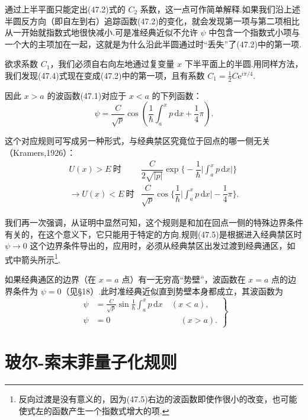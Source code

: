 通过上半平面只能定出(47.2)式的 $C_2$ 系数，这一点可作简单解释.如果我们沿上述半圆反方向（即自左到右）追踪函数(47.2)的变化，就会发现第一项与第二项相比从一开始就指数式地很快减小.可是准经典近似不允许 $\psi$ 中包含一个指数式小项与一个大的主项加在一起，这就是为什么沿此半圆通过时“丢失”了(47.2)中的第一项.

欲求系数 $C_1$，我们必须自右向左地通过复变量 $x$ 下半平面上的半圆.用同样方法，我们发现(47.4)式现在变成(47.2)中的第一项，且有系数 $C_1=\frac{1}{2}C\mathrm{e}^{i\pi/4}$.

因此 $x>a$ 的波函数(47.1)对应于 $x<a$ 的下列函数：
\begin{equation*}
  \psi=\frac{C}{\sqrt{p}}\cos\left(\frac{1}{\hbar}\int_a^x p\,\mathrm{d}x+\frac{1}{4}\pi\right).
\end{equation*}

这个对应规则可写成另一种形式，与经典禁区究竟位于回点的哪一侧无关（Kramers,1926）：
\begin{equation}
\begin{array}{ll}
  U(x)>E\ \text{时} &
  \dfrac{C}{2\sqrt{|p|}}\exp\Big\{-\dfrac{1}{\hbar}
  \Big|\int_a^x p\,\mathrm{d}x\Big|\Big\}\\[2ex]
  \longrightarrow U(x)<E\ \text{时} &
  \dfrac{C}{\sqrt{p}}\cos\Big\{\dfrac{1}{\hbar}
  \Big|\int_a^x p\,\mathrm{d}x\Big|-\dfrac{1}{4}\pi\Big\}.
\end{array}
\end{equation}

我们再一次强调，从证明中显然可知，这个规则是和加在回点一侧的特殊边界条件有关的，在这个意义下，它只能用于特定的方向.规则(47.5)是根据进入经典禁区时 $\psi\to0$ 这个边界条件导出的，应用时，必须从经典禁区出发过渡到经典通区，如式中箭头所示\footnote{反向过渡是没有意义的，因为(47.5)右边的波函数即使作很小的改变，也可能使式左的函数产生一个指数式增大的项.}.

如果经典通区的边界（在 $x=a$ 点）有一无穷高“势壁”，波函数在 $x=a$ 点的边界条件为 $\psi=0$（见§18）.此时准经典近似直到势壁本身都成立，其波函数为
\begin{equation}
\left.\begin{aligned}
  \psi&=\frac{C}{\sqrt{p}}\sin\frac{1}{\hbar}\int_a^x p\,\mathrm{d}x
  \quad(x<a),\\
  \psi&=0\qquad\qquad\qquad\qquad\ \ (x>a).
\end{aligned}\right\}
\end{equation}

\section{玻尔-索末菲量子化规则}

